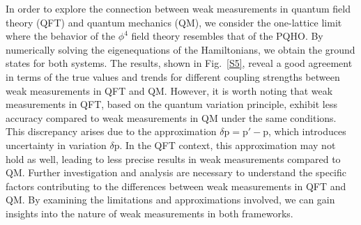 \documentclass[twocolumn,pra,aps,superscriptaddress]{revtex4-2}
\begin{document}
In order to explore the connection between weak measurements in quantum field theory (QFT) and quantum mechanics (QM), we consider the one-lattice limit where the behavior of the $\phi^4$ field theory resembles that of the PQHO. By numerically solving the eigenequations of the Hamiltonians, we obtain the ground states for both systems. The results, shown in Fig.~\ref{S5}, reveal a good agreement in terms of the true values and trends for different coupling strengths between weak measurements in QFT and QM.
However, it is worth noting that weak measurements in QFT, based on the quantum variation principle, exhibit less accuracy compared to weak measurements in QM under the same conditions. This discrepancy arises due to the approximation $\delta \text{p} = \text{p}' - \text{p}$, which introduces uncertainty in variation $\delta \text{p}$. In the QFT context, this approximation may not hold as well, leading to less precise results in weak measurements compared to QM.
Further investigation and analysis are necessary to understand the specific factors contributing to the differences between weak measurements in QFT and QM. By examining the limitations and approximations involved, we can gain insights into the nature of weak measurements in both frameworks.
\end{document}
